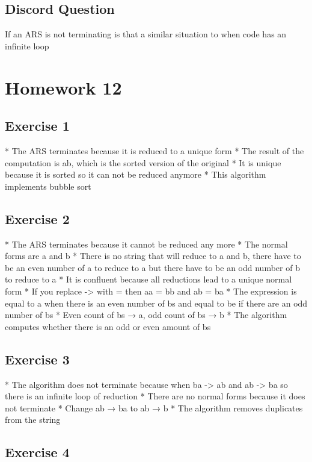 \documentclass{article}
\theoremstyle{plain}
\theoremstyle{definition}
\theoremstyle{remark}
\begin{document}
\subsection{Discord Question}

If an ARS is not terminating is that a similar situation to when code has an infinite loop


\section{Homework 12}\label{homework12}

\subsection{Exercise 1}

* The ARS terminates because it is reduced to a unique form 
* The result of the computation is ab, which is the sorted version of the original
* It is unique because it is sorted so it can not be reduced anymore
* This algorithm implements bubble sort

\subsection{Exercise 2}

* The ARS terminates because it cannot be reduced any more
* The normal forms are a and b
* There is no string that will reduce to a and b, there have to be an even number of a to reduce to a but there have to be an odd number of b to reduce to a
* It is confluent because all reductions lead to a unique normal form
* If you replace -> with = then aa = bb and ab = ba
* The expression is equal to a when there is an even number of bs and equal to be if there are an odd number of bs
* Even count of bs → a, odd count of bs → b
* The algorithm computes whether there is an odd or even amount of bs

\subsection{Exercise 3}

* The algorithm does not terminate because when ba -> ab and ab -> ba so there is an infinite loop of reduction
* There are no normal forms because it does not terminate
* Change ab → ba to ab → b
* The algorithm removes duplicates from the string

\subsection{Exercise 4}
\end{document}
